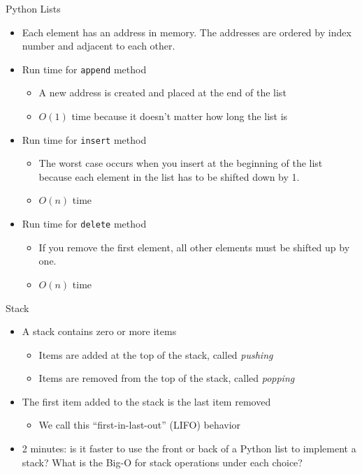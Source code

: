 \documentclass[
  ignorenonframetext,
]{beamer}
\providecommand{\tightlist}{%
  \setlength{\itemsep}{0pt}\setlength{\parskip}{0pt}}\usepackage{longtable,booktabs,array}
\begin{document}
\begin{frame}[fragile]{Python Lists}
\protect\hypertarget{python-lists}{}
\begin{itemize}
\item
  Each element has an address in memory. The addresses are ordered by
  index number and adjacent to each other.
\item
  Run time for \texttt{append} method

  \begin{itemize}
  \item
    A new address is created and placed at the end of the list
  \item
    \(O(1)\) time because it doesn't matter how long the list is
  \end{itemize}
\item
  Run time for \texttt{insert} method

  \begin{itemize}
  \item
    The worst case occurs when you insert at the beginning of the list
    because each element in the list has to be shifted down by 1.
  \item
    \(O(n)\) time
  \end{itemize}
\item
  Run time for \texttt{delete} method

  \begin{itemize}
  \item
    If you remove the first element, all other elements must be shifted
    up by one.
  \item
    \(O(n)\) time
  \end{itemize}
\end{itemize}
\end{frame}

\begin{frame}{Stack}
\protect\hypertarget{stack}{}
\begin{itemize}
\item
  A stack contains zero or more items

  \begin{itemize}
  \item
    Items are added at the top of the stack, called \emph{pushing}
  \item
    Items are removed from the top of the stack, called \emph{popping}
  \end{itemize}
\item
  The first item added to the stack is the last item removed

  \begin{itemize}
  \tightlist
  \item
    We call this ``first-in-last-out'' (LIFO) behavior
  \end{itemize}
\item
  2 minutes: is it faster to use the front or back of a Python list to
  implement a stack? What is the Big-O for stack operations under each
  choice?
\end{itemize}
\end{frame}
\end{document}
